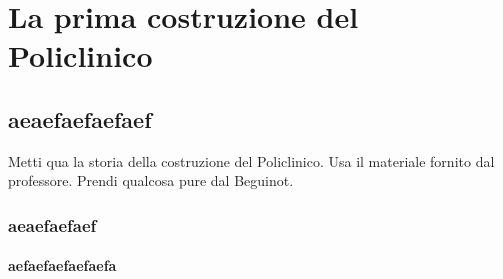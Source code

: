 \chapter{La prima costruzione del Policlinico}
\thispagestyle{empty}
\section{aeaefaefaefaef}
Metti qua la storia della costruzione del Policlinico. Usa il materiale fornito dal professore. Prendi qualcosa pure dal Beguinot.
\subsection{aeaefaefaef}
\subsubsection{aefaefaefaefaefa}